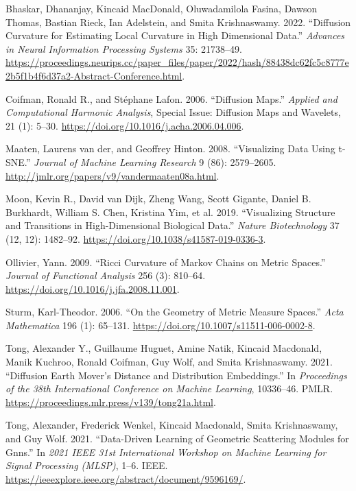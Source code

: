 \documentclass[
  letterpaper,
  DIV=11,
  numbers=noendperiod]{scrartcl}
\newlength{\cslhangindent}
\newenvironment{CSLReferences}[2] %
 {\begin{list}{}{%
  \setlength{\itemindent}{0pt}
  \setlength{\leftmargin}{0pt}
  \setlength{\parsep}{0pt}
  \ifodd #1
   \setlength{\leftmargin}{\cslhangindent}
   \setlength{\itemindent}{-1\cslhangindent}
  \fi
  \setlength{\itemsep}{#2\baselineskip}}}
 {\end{list}}
\theoremstyle{plain}
\theoremstyle{plain}
\theoremstyle{definition}
\theoremstyle{definition}
\theoremstyle{remark}
\begin{document}
\label{refs}
\begin{CSLReferences}{1}{0}
Bhaskar, Dhananjay, Kincaid MacDonald, Oluwadamilola Fasina, Dawson
Thomas, Bastian Rieck, Ian Adelstein, and Smita Krishnaswamy. 2022.
{``Diffusion Curvature for Estimating Local Curvature in High
Dimensional Data.''} \emph{Advances in Neural Information Processing
Systems} 35: 21738--49.
\url{https://proceedings.neurips.cc/paper_files/paper/2022/hash/88438dc62fc5c8777e2b5f1b4f6d37a2-Abstract-Conference.html}.

Coifman, Ronald R., and Stéphane Lafon. 2006. {``Diffusion Maps.''}
\emph{Applied and Computational Harmonic Analysis}, Special {Issue}:
{Diffusion Maps} and {Wavelets}, 21 (1): 5--30.
\url{https://doi.org/10.1016/j.acha.2006.04.006}.

Maaten, Laurens van der, and Geoffrey Hinton. 2008. {``Visualizing
{Data} Using t-{SNE}.''} \emph{Journal of Machine Learning Research} 9
(86): 2579--2605. \url{http://jmlr.org/papers/v9/vandermaaten08a.html}.

Moon, Kevin R., David van Dijk, Zheng Wang, Scott Gigante, Daniel B.
Burkhardt, William S. Chen, Kristina Yim, et al. 2019. {``Visualizing
Structure and Transitions in High-Dimensional Biological Data.''}
\emph{Nature Biotechnology} 37 (12, 12): 1482--92.
\url{https://doi.org/10.1038/s41587-019-0336-3}.

Ollivier, Yann. 2009. {``Ricci Curvature of {Markov} Chains on Metric
Spaces.''} \emph{Journal of Functional Analysis} 256 (3): 810--64.
\url{https://doi.org/10.1016/j.jfa.2008.11.001}.

Sturm, Karl-Theodor. 2006. {``On the Geometry of Metric Measure
Spaces.''} \emph{Acta Mathematica} 196 (1): 65--131.
\url{https://doi.org/10.1007/s11511-006-0002-8}.

Tong, Alexander Y., Guillaume Huguet, Amine Natik, Kincaid Macdonald,
Manik Kuchroo, Ronald Coifman, Guy Wolf, and Smita Krishnaswamy. 2021.
{``Diffusion {Earth Mover}'s {Distance} and {Distribution
Embeddings}.''} In \emph{Proceedings of the 38th {International
Conference} on {Machine Learning}}, 10336--46. PMLR.
\url{https://proceedings.mlr.press/v139/tong21a.html}.

Tong, Alexander, Frederick Wenkel, Kincaid Macdonald, Smita
Krishnaswamy, and Guy Wolf. 2021. {``Data-Driven Learning of Geometric
Scattering Modules for Gnns.''} In \emph{2021 {IEEE} 31st {International
Workshop} on {Machine Learning} for {Signal Processing} ({MLSP})}, 1--6.
IEEE. \url{https://ieeexplore.ieee.org/abstract/document/9596169/}.

\end{CSLReferences}
\end{document}
